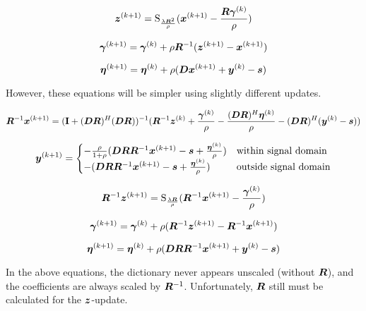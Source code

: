\documentclass{article}
\begin{document}
\begin{equation}
\bm{z}^{(k + 1)}= \operatorname{S}_{\frac{\lambda\bm{R}^2}{\rho}}(\bm{x}^{(k+1)} - \frac{\bm{R}\bm{\gamma}^{(k)}}{\rho})
\end{equation}

\begin{equation}
\bm{\gamma}^{(k + 1)} = \bm{\gamma}^{(k)} + \rho\bm{R}^{-1}(\bm{z}^{(k + 1)} - \bm{x}^{(k + 1)})
\end{equation}

\begin{equation}
\bm{\eta}^{(k + 1)} = \bm{\eta}^{(k)} + \rho(\bm{D}\bm{x}^{(k + 1)} + \bm{y}^{(k)} - \bm{s})
\end{equation}

However, these equations will be simpler using slightly different updates.

\begin{equation}
\bm{R}^{-1}\bm{x}^{(k + 1)} = ({\bf I} + (\bm{D}\bm{R})^H(\bm{D}\bm{R}))^{-1}(\bm{R}^{-1}\bm{z}^{(k)} + \frac{\bm{\gamma}^{(k)}}{\rho} - \frac{(\bm{D}\bm{R})^H\bm{\eta}^{(k)}}{\rho} - (\bm{D}\bm{R})^H(\bm{y}^{(k)} - \bm{s}))
\end{equation}

\begin{equation}
\bm{y}^{(k + 1)}= \begin{cases}
-\frac{\rho}{1 + \rho}(\bm{D}\bm{R}\bm{R}^{-1}\bm{x}^{(k + 1)} - \bm{s}  + \frac{\bm{\eta}^{(k)}}{\rho}) & \text{within signal domain}\\
-(\bm{D}\bm{R}\bm{R}^{-1}\bm{x}^{(k + 1)} - \bm{s}  + \frac{\bm{\eta}^{(k)}}{\rho}) & \text{outside signal domain}
\end{cases}
\end{equation}

\begin{equation}
\bm{R}^{-1}\bm{z}^{(k + 1)}= \operatorname{S}_{\frac{\lambda\bm{R}}{\rho}}(\bm{R}^{-1}\bm{x}^{(k+1)} - \frac{\bm{\gamma}^{(k)}}{\rho})
\end{equation}

\begin{equation}
\bm{\gamma}^{(k + 1)} = \bm{\gamma}^{(k)} + \rho(\bm{R}^{-1}\bm{z}^{(k + 1)} - \bm{R}^{-1}\bm{x}^{(k + 1)})
\end{equation}

\begin{equation}
\bm{\eta}^{(k + 1)} = \bm{\eta}^{(k)} + \rho(\bm{D}\bm{R}\bm{R}^{-1}\bm{x}^{(k + 1)} + \bm{y}^{(k)} - \bm{s})
\end{equation}


In the above equations, the dictionary never appears unscaled (without $\bm{R}$), and the coefficients are always scaled by $\bm{R}^{-1}$. Unfortunately,  $\bm{R}$ still must be calculated for the $\bm{z}$-update.
\end{document}
